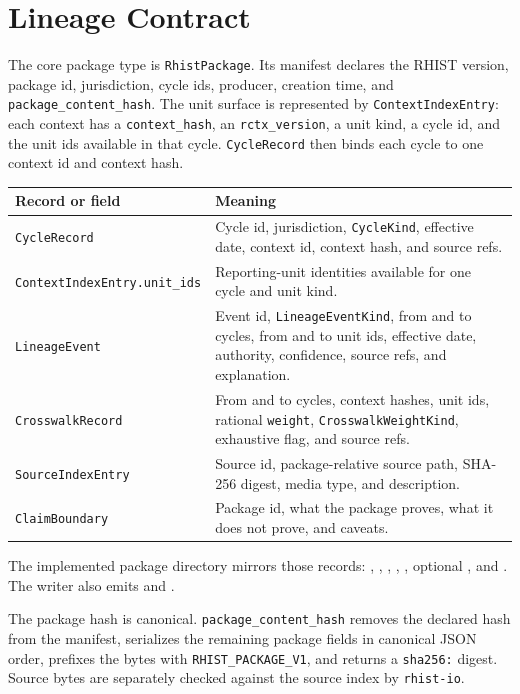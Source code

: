\section{Lineage Contract}

The core package type is \texttt{RhistPackage}. Its manifest declares the
RHIST version, package id, jurisdiction, cycle ids, producer, creation time, and
\texttt{package\_content\_hash}. The unit surface is represented by
\texttt{ContextIndexEntry}: each context has a \texttt{context\_hash}, an
\texttt{rctx\_version}, a unit kind, a cycle id, and the unit ids available in
that cycle. \texttt{CycleRecord} then binds each cycle to one context id and
context hash.

\begin{center}
\small
\begin{tabularx}{\textwidth}{lX}
\toprule
Record or field & Meaning \\
\midrule
\texttt{CycleRecord} & Cycle id, jurisdiction, \texttt{CycleKind}, effective date, context id, context hash, and source refs. \\
\texttt{ContextIndexEntry.unit\_ids} & Reporting-unit identities available for one cycle and unit kind. \\
\texttt{LineageEvent} & Event id, \texttt{LineageEventKind}, from and to cycles, from and to unit ids, effective date, authority, confidence, source refs, and explanation. \\
\texttt{CrosswalkRecord} & From and to cycles, context hashes, unit ids, rational \texttt{weight}, \texttt{CrosswalkWeightKind}, exhaustive flag, and source refs. \\
\texttt{SourceIndexEntry} & Source id, package-relative source path, SHA-256 digest, media type, and description. \\
\texttt{ClaimBoundary} & Package id, what the package proves, what it does not prove, and caveats. \\
\bottomrule
\end{tabularx}
\end{center}

The implemented package directory mirrors those records:
, ,
, ,
, optional
, and
. The writer also emits
 and
.

The package hash is canonical. \texttt{package\_content\_hash} removes the
declared hash from the manifest, serializes the remaining package fields in
canonical JSON order, prefixes the bytes with \texttt{RHIST\_PACKAGE\_V1}, and
returns a \texttt{sha256:} digest. Source bytes are separately checked against
the source index by \texttt{rhist-io}.
